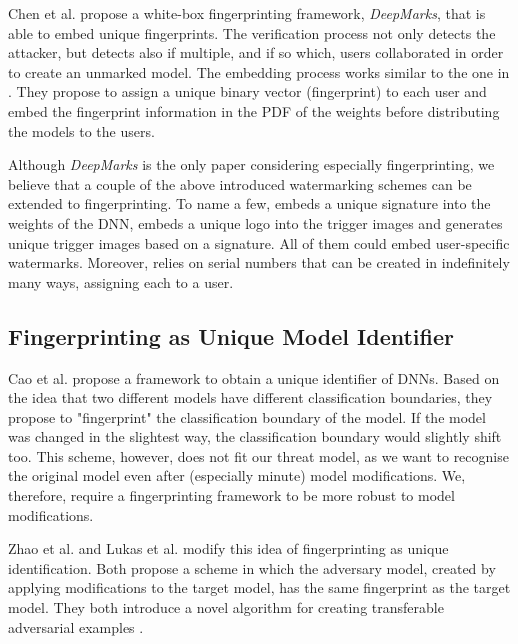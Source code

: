 Chen et al. \cite{chen_deepmarks_2019} propose a white-box fingerprinting framework, \textit{DeepMarks}, that is able to embed unique fingerprints. The verification process not only detects the attacker, but detects also if multiple, and if so which, users collaborated in order to create an unmarked model. The embedding process works similar to the one in \cite{rouhani_deepsigns_2019}. They propose to assign a unique binary vector (fingerprint) to each user and embed the fingerprint information in the PDF of the weights before distributing the models to the users.

Although \textit{DeepMarks} is the only paper considering especially fingerprinting, we believe that a couple of the above introduced watermarking schemes can be extended to fingerprinting. To name a few, \cite{uchida_embedding_2017} embeds a unique signature into the weights of the DNN, \cite{li_how_2019} embeds a unique logo into the trigger images and \cite{guo_watermarking_2018} generates unique trigger images based on a signature. All of them could embed user-specific watermarks. Moreover, \cite{xu_identity_2020} relies on serial numbers that can be created in indefinitely many ways, assigning each to a user.

\subsection{Fingerprinting as Unique Model Identifier}
Cao et al. \cite{cao_ipguard_2020} propose a framework to obtain a unique identifier of DNNs. %
Based on the idea that two different models have different classification boundaries, they propose to "fingerprint" the classification boundary of the model. If the model was changed in the slightest way, the classification boundary would slightly shift too. This scheme, however, does not fit our threat model, as we want to recognise the original model even after (especially minute) model modifications. We, therefore, require a fingerprinting framework to be more robust to model modifications.


Zhao et al. \cite{zhao_afa_2019} and Lukas et al. \cite{lukas_deep_2020} modify this idea of fingerprinting as unique identification. Both propose a scheme in which the adversary model, created by applying modifications to the target model, has the same fingerprint as the target model. They both introduce a novel algorithm for creating transferable adversarial examples \cite{liu_delving_2017}. %

